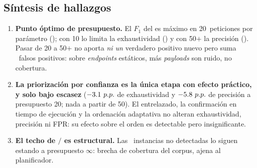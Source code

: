 \subsection{Síntesis de hallazgos}
\label{sec:res-sintesis}

\begin{enumerate}
  \item \textbf{Punto óptimo de presupuesto.} El $F_1$ del  es
  máximo en \num{20}~peticiones por parámetro (\ValorFOneBVeinte{}); con
  \num{10} lo limita la exhaustividad (\ValorFOneBDiez{}) y con \num{50}$+$ la
  precisión (\ValorFOneBCincuenta{}). Pasar de \num{20} a \num{50}$+$ no aporta
  \emph{ni un} verdadero positivo nuevo pero suma
  \SaturacionFPnuevos{}~falsos positivos: sobre \emph{endpoints} estáticos,
  más \emph{payloads} son ruido, no cobertura.
  \item \textbf{La priorización por confianza es la única etapa con efecto
  práctico, y solo bajo escasez} ($-\num{3.1}~p.p.{}$ de exhaustividad
  y $-\num{5.8}~p.p.{}$ de precisión a presupuesto \num{20}; nada a
  partir de \num{50}). El entrelazado, la confirmación en tiempo de ejecución
  y la ordenación adaptativa no alteran exhaustividad, precisión ni FPR: su
  efecto sobre el orden es detectable pero insignificante.
  \item \textbf{El techo de \ValorTPtecho{}$/$\NumVulnerables{} es
  estructural.} Las \ValorFNtecho{}~instancias no detectadas lo siguen estando
  a presupuesto $\infty$: brecha de cobertura del corpus, ajena al
  planificador.
\end{enumerate}
